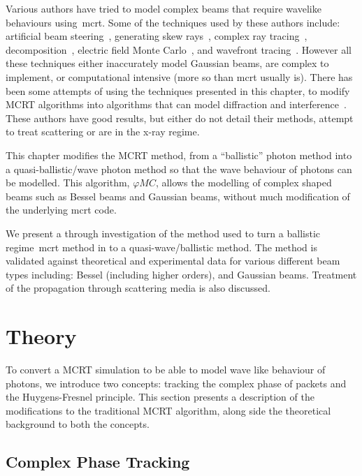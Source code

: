 Various authors have tried to model complex beams that require wavelike behaviours using~\gls*{mcrt}.
Some of the techniques used by these authors include: artificial beam steering~\cite{hokr2015modeling}, generating skew rays~\cite{arnaud1985representation}, complex ray tracing~\cite{harvey2015modeling}, decomposition~\cite{worku2018decomposition}, electric field Monte Carlo~\cite{cai2014electric}, and wavefront tracing~\cite{volpe2017huygens}.
However all these techniques either inaccurately model Gaussian beams, are complex to implement, or computational intensive (more so than \gls*{mcrt} usually is).
There has been some attempts of using the techniques presented in this chapter, to modify MCRT algorithms into algorithms that can model diffraction and interference~\cite{mignon2016fractional,peter2014combining,mahan2018monte,mout2016simulating,fischer2008monte}.
These authors have good results, but either do not detail their methods, attempt to treat scattering or are in the x-ray regime.


This chapter modifies the MCRT method, from a ``ballistic'' photon method into a quasi-ballistic/wave photon method so that the wave behaviour of photons can be modelled.
This algorithm, $\varphi MC$, allows the modelling of complex shaped beams such as Bessel beams and Gaussian beams, without much modification of the underlying \gls*{mcrt} code.

We present a through investigation of the method used to turn a ballistic regime~\gls*{mcrt} method in to a quasi-wave/ballistic method.
The method is validated against theoretical and experimental data for various different beam types including: Bessel (including higher orders), and Gaussian beams.
Treatment of the propagation through scattering media is also discussed.


\section{Theory}\label{sec:bestheory}

To convert a MCRT simulation to be able to model wave like behaviour of photons, we introduce two concepts: tracking the complex phase of packets and the Huygens-Fresnel principle.
This section presents a description of the modifications to the traditional MCRT algorithm, along side the theoretical background to both the concepts.

\subsection{Complex Phase Tracking}

